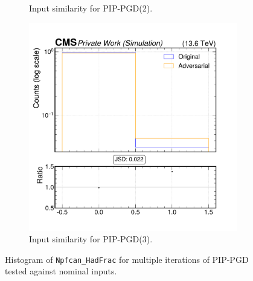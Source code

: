 \begin{figure}[h]
\begin{subfigure}[t]{0.32\textwidth}
    \caption*{Input similarity for PIP-PGD(2).}
  \end{subfigure}\hfill
  \begin{subfigure}[t]{0.32\textwidth}
    \includegraphics[width=\linewidth]{media/output/features/compare/combined_it_3/cmp_npf_arr_Npfcan_HadFrac.pdf}
    \caption*{Input similarity for PIP-PGD(3).}
  \end{subfigure}

  \caption*{Histogram of \texttt{Npfcan\_HadFrac} for multiple iterations of PIP-PGD tested against nominal inputs.}
  \label{fig:combined_input_Npfcan_HadFrac}
\end{figure}

